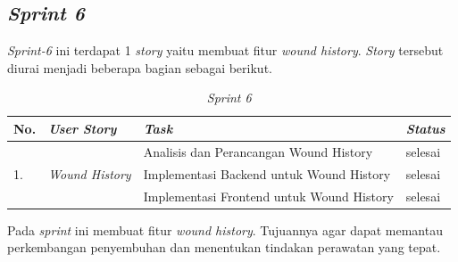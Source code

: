 \subsection{\textit{Sprint 6}}
\textit{Sprint-6} ini terdapat 1 \textit{story} yaitu membuat fitur \textit{wound history}. \textit{Story} tersebut diurai menjadi beberapa bagian sebagai berikut.
	\begin{table}[H]
	\caption{\textit{Sprint 6}}
	\label{sprint6_backlog}
	\begin{tabular}{@{} |p{0.5cm}|p{5cm}|p{5cm}|p{2cm}| @{}}
		\hline
		\textbf{No.} & \textbf{\textit{User Story}} & \textbf{\textit{Task}} & \textbf{\textit{Status}} \\
		\hline
		\multirow{3}{3cm}{1.} & \multirow{3}{5cm}{\textit{Wound History}} & Analisis dan Perancangan Wound History & selesai\\
		\cline{3-4}
		 & & Implementasi Backend untuk Wound History & selesai\\
		\cline{3-4}
		& & Implementasi Frontend untuk Wound History & selesai\\
		\hline
	\end{tabular}
	\end{table}
Pada \textit{sprint} ini membuat fitur \textit{wound history}. Tujuannya agar dapat memantau perkembangan penyembuhan dan menentukan tindakan perawatan yang tepat.
